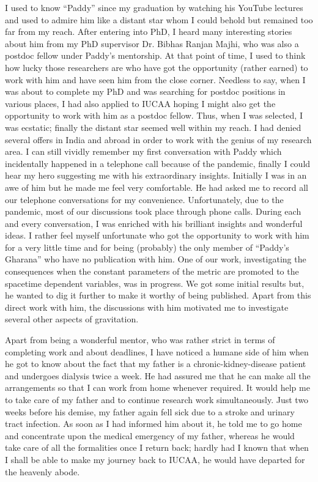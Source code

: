 \documentclass[prd, preprint, longbibliography, 12pt]{revtex4-2}
\begin{document}
\noindent  I used to know “Paddy” since my graduation by watching his YouTube lectures and used to admire him like a distant star whom I could behold but remained too far from my reach. After entering into PhD, I heard many interesting stories about him from my PhD supervisor Dr. Bibhas Ranjan Majhi, who was also a postdoc fellow under Paddy’s mentorship. At that point of time, I used to think how lucky those researchers are who have got the opportunity (rather earned) to work with him and have seen him from the close corner. Needless to say, when I was about to complete my PhD and was searching for postdoc positions in various places, I had also applied to IUCAA hoping I might also get the opportunity to work with him as a postdoc fellow. Thus, when I was selected, I was ecstatic; finally the distant star seemed well within my reach. I had denied several offers in India and abroad in order to work with the genius of my research area. I can still vividly remember my first conversation with Paddy which incidentally happened in a telephone call because of the pandemic, finally I could hear my hero suggesting me with his extraordinary insights. Initially I was in an awe of him but he made me feel very comfortable. He had asked me to record all our telephone conversations for my convenience. Unfortunately, due to the pandemic, most of our discussions took place through phone calls. During each and every conversation, I was enriched with his brilliant insights and wonderful ideas. I rather feel myself unfortunate who got the opportunity to work with him for a very little time and for being (probably) the only member of “Paddy’s Gharana” who have no publication with him. One of our work, investigating the consequences when the constant parameters of the metric are promoted to the spacetime dependent variables, was in progress. We got some initial results but, he wanted to dig it further to make it worthy of being published. Apart from this direct work with him, the discussions with him motivated me to investigate several other aspects of gravitation.

    Apart from being a wonderful mentor, who was rather strict in terms of completing work and about deadlines, I have noticed a humane side of him when he got to know about the fact that my father is a chronic-kidney-disease patient and undergoes dialysis twice a week. He had assured me that he can make all the arrangements so that I can work from home whenever required. It would help me to take care of my father and to continue research work simultaneously. Just two weeks before his demise, my father again fell sick due to a stroke and urinary tract infection. As soon as I had informed him about it, he told me to go home and concentrate upon the medical emergency of my father, whereas he would take care of all the formalities once I return back; hardly had I known that when I shall be able to make my journey back to IUCAA, he would have departed for the heavenly abode.
\end{document}
